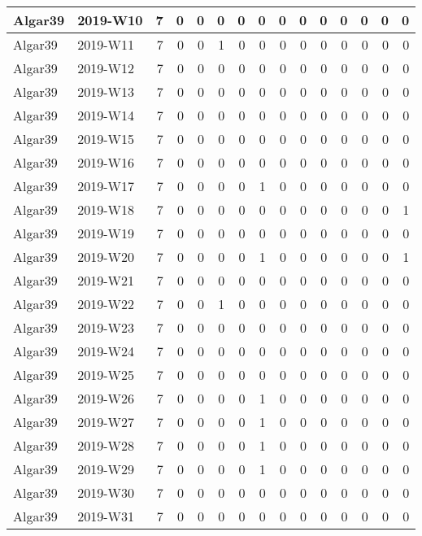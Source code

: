 \documentclass[]{book}
\begin{document}
\begin{table}
\begin{tabular}[t]{l|l|r|r|r|r|r|r|r|r|r|r|r|r|r}
\hline
Algar39 & 2019-W10 & 7 & 0 & 0 & 0 & 0 & 0 & 0 & 0 & 0 & 0 & 0 & 0 & 0\\
\hline
Algar39 & 2019-W11 & 7 & 0 & 0 & 1 & 0 & 0 & 0 & 0 & 0 & 0 & 0 & 0 & 0\\
\hline
Algar39 & 2019-W12 & 7 & 0 & 0 & 0 & 0 & 0 & 0 & 0 & 0 & 0 & 0 & 0 & 0\\
\hline
Algar39 & 2019-W13 & 7 & 0 & 0 & 0 & 0 & 0 & 0 & 0 & 0 & 0 & 0 & 0 & 0\\
\hline
Algar39 & 2019-W14 & 7 & 0 & 0 & 0 & 0 & 0 & 0 & 0 & 0 & 0 & 0 & 0 & 0\\
\hline
Algar39 & 2019-W15 & 7 & 0 & 0 & 0 & 0 & 0 & 0 & 0 & 0 & 0 & 0 & 0 & 0\\
\hline
Algar39 & 2019-W16 & 7 & 0 & 0 & 0 & 0 & 0 & 0 & 0 & 0 & 0 & 0 & 0 & 0\\
\hline
Algar39 & 2019-W17 & 7 & 0 & 0 & 0 & 0 & 1 & 0 & 0 & 0 & 0 & 0 & 0 & 0\\
\hline
Algar39 & 2019-W18 & 7 & 0 & 0 & 0 & 0 & 0 & 0 & 0 & 0 & 0 & 0 & 0 & 1\\
\hline
Algar39 & 2019-W19 & 7 & 0 & 0 & 0 & 0 & 0 & 0 & 0 & 0 & 0 & 0 & 0 & 0\\
\hline
Algar39 & 2019-W20 & 7 & 0 & 0 & 0 & 0 & 1 & 0 & 0 & 0 & 0 & 0 & 0 & 1\\
\hline
Algar39 & 2019-W21 & 7 & 0 & 0 & 0 & 0 & 0 & 0 & 0 & 0 & 0 & 0 & 0 & 0\\
\hline
Algar39 & 2019-W22 & 7 & 0 & 0 & 1 & 0 & 0 & 0 & 0 & 0 & 0 & 0 & 0 & 0\\
\hline
Algar39 & 2019-W23 & 7 & 0 & 0 & 0 & 0 & 0 & 0 & 0 & 0 & 0 & 0 & 0 & 0\\
\hline
Algar39 & 2019-W24 & 7 & 0 & 0 & 0 & 0 & 0 & 0 & 0 & 0 & 0 & 0 & 0 & 0\\
\hline
Algar39 & 2019-W25 & 7 & 0 & 0 & 0 & 0 & 0 & 0 & 0 & 0 & 0 & 0 & 0 & 0\\
\hline
Algar39 & 2019-W26 & 7 & 0 & 0 & 0 & 0 & 1 & 0 & 0 & 0 & 0 & 0 & 0 & 0\\
\hline
Algar39 & 2019-W27 & 7 & 0 & 0 & 0 & 0 & 1 & 0 & 0 & 0 & 0 & 0 & 0 & 0\\
\hline
Algar39 & 2019-W28 & 7 & 0 & 0 & 0 & 0 & 1 & 0 & 0 & 0 & 0 & 0 & 0 & 0\\
\hline
Algar39 & 2019-W29 & 7 & 0 & 0 & 0 & 0 & 1 & 0 & 0 & 0 & 0 & 0 & 0 & 0\\
\hline
Algar39 & 2019-W30 & 7 & 0 & 0 & 0 & 0 & 0 & 0 & 0 & 0 & 0 & 0 & 0 & 0\\
\hline
Algar39 & 2019-W31 & 7 & 0 & 0 & 0 & 0 & 0 & 0 & 0 & 0 & 0 & 0 & 0 & 0\\

\end{tabular}
\end{table}
\end{document}
